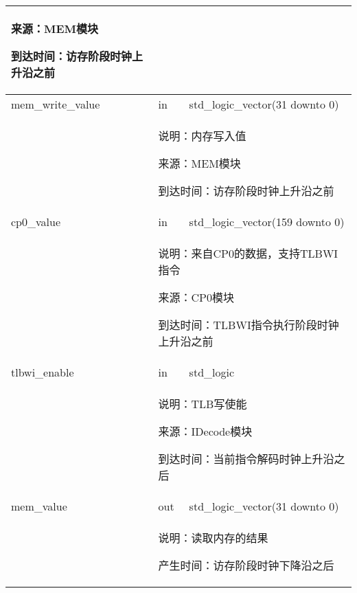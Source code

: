 \begin{tabularx}{\textwidth}{lll}
{                来源：MEM模块

                到达时间：访存阶段时钟上升沿之前
            } \\
            \midrule
            mem\_write\_value & in      & std\_logic\_vector(31 downto 0) \\
            \cmidrule(l){2-3}
            &
            \multicolumn{2}{X}{
                说明：内存写入值

                来源：MEM模块

                到达时间：访存阶段时钟上升沿之前
            } \\
            \midrule
            cp0\_value      & in        & std\_logic\_vector(159 downto 0) \\
            \cmidrule(l){2-3}
            &
            \multicolumn{2}{X}{
                说明：来自CP0的数据，支持TLBWI指令

                来源：CP0模块

                到达时间：TLBWI指令执行阶段时钟上升沿之前
            } \\
            \midrule
            tlbwi\_enable   & in        & std\_logic \\
            \cmidrule(l){2-3}
            &
            \multicolumn{2}{X}{
                说明：TLB写使能

                来源：IDecode模块

                到达时间：当前指令解码时钟上升沿之后
            } \\
            \midrule
            mem\_value      & out       & std\_logic\_vector(31 downto 0) \\
            \cmidrule(l){2-3}
            &
            \multicolumn{2}{X}{
                说明：读取内存的结果

                产生时间：访存阶段时钟下降沿之后
            } \\

            \bottomrule
        \end{tabularx}
